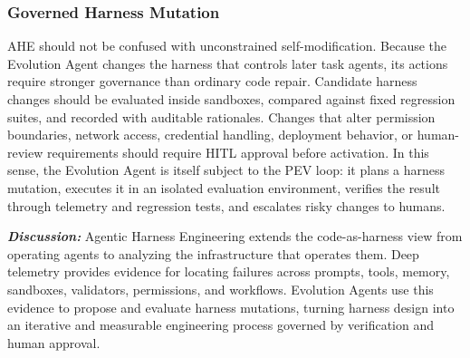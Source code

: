 \subsubsection{Governed Harness Mutation}
AHE should not be confused with unconstrained self-modification. Because the Evolution Agent changes the harness that controls later task agents, its actions require stronger governance than ordinary code repair. Candidate harness changes should be evaluated inside sandboxes, compared against fixed regression suites, and recorded with auditable rationales. Changes that alter permission boundaries, network access, credential handling, deployment behavior, or human-review requirements should require HITL approval before activation. In this sense, the Evolution Agent is itself subject to the PEV loop: it plans a harness mutation, executes it in an isolated evaluation environment, verifies the result through telemetry and regression tests, and escalates risky changes to humans.

\textbf{\textit{Discussion:}} Agentic Harness Engineering extends the code-as-harness view from operating agents to analyzing the infrastructure that operates them. Deep telemetry provides evidence for locating failures across prompts, tools, memory, sandboxes, validators, permissions, and workflows. Evolution Agents use this evidence to propose and evaluate harness mutations, turning harness design into an iterative and measurable engineering process governed by verification and human approval.
